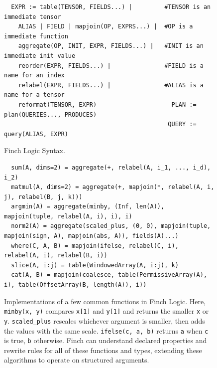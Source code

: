 
\begin{figure}
  \scriptsize
\begin{verbatim}
  EXPR := table(TENSOR, FIELDS...) |         #TENSOR is an immediate tensor
    ALIAS | FIELD | mapjoin(OP, EXPRS...) |  #OP is a immediate function
    aggregate(OP, INIT, EXPR, FIELDS...) |   #INIT is an immediate init value
    reorder(EXPR, FIELDS...) |               #FIELD is a name for an index
    relabel(EXPR, FIELDS...) |               #ALIAS is a name for a tensor
    reformat(TENSOR, EXPR)                     PLAN := plan(QUERIES..., PRODUCES)
                                              QUERY := query(ALIAS, EXPR)
\end{verbatim}
\caption{\scriptsize Finch Logic Syntax. }\label{fig:finch_logic_syntax}
\begin{verbatim}
  sum(A, dims=2) = aggregate(+, relabel(A, i_1, ..., i_d), i_2)
  matmul(A, dims=2) = aggregate(+, mapjoin(*, relabel(A, i, j), relabel(B, j, k)))
  argmin(A) = aggregate(minby, (Inf, len(A)), mapjoin(tuple, relabel(A, i), i), i)
  norm2(A) = aggregate(scaled_plus, (0, 0), mapjoin(tuple, mapjoin(sign, A), mapjoin(abs, A)), fields(A)...)
  where(C, A, B) = mapjoin(ifelse, relabel(C, i), relabel(A, i), relabel(B, i))
  slice(A, i:j) = table(WindowedArray(A, i:j), k)
  cat(A, B) = mapjoin(coalesce, table(PermissiveArray(A), i), table(OffsetArray(B, length(A)), i))
\end{verbatim}
\caption{\scriptsize Implementations of a few common functions in Finch Logic. Here, \texttt{minby(x, y)} compares \texttt{x[1]} and \texttt{y[1]} and returns the smaller \texttt{x} or \texttt{y}. \texttt{scaled\_plus} rescales whichever argument is smaller, then adds the values with the same scale. \texttt{ifelse(c, a, b)} returns \texttt{a} when \texttt{c} is true,  \texttt{b} otherwise. Finch can understand declared properties and rewrite rules for all of these functions and types, extending these algorithms to operate on structured arguments.} \label{fig:api_extensible}
\end{figure}
